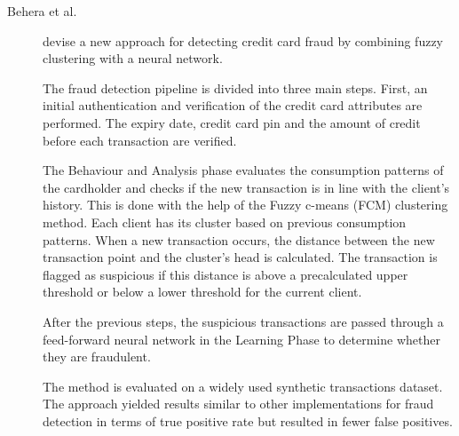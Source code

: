 \begin{description}
    \item[Behera et al.]\cite{Behera.Panigrahi_CreditCardFraud_2015} devise a new approach for detecting credit card fraud by combining fuzzy clustering with a neural network. 
    
    The fraud detection pipeline is divided into three main steps. First, an initial authentication and verification of the credit card attributes are performed. The expiry date, credit card pin and the amount of credit before each transaction are verified. 
    
    The Behaviour and Analysis phase evaluates the consumption patterns of the cardholder and checks if the new transaction is in line with the client's history. This is done with the help of the Fuzzy c-means (FCM) clustering method. Each client has its cluster based on previous consumption patterns. When a new transaction occurs, the distance between the new transaction point and the cluster's head is calculated. The transaction is flagged as suspicious if this distance is above a precalculated upper threshold or below a lower threshold for the current client.

    After the previous steps, the suspicious transactions are passed through a feed-forward neural network in the Learning Phase to determine whether they are fraudulent.

    The method is evaluated on a widely used synthetic transactions dataset. The approach yielded results similar to other implementations for fraud detection in terms of true positive rate but resulted in fewer false positives.
\end{description}

